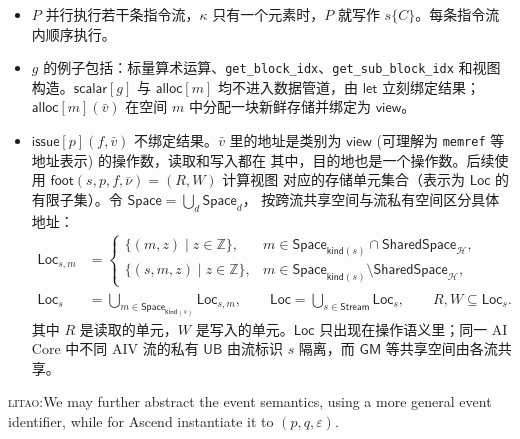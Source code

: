 \documentclass[UTF8,a4paper,11pt,fontset=fandol]{ctexart}
\newcommand{\kw}[1]{\ensuremath{\mathsf{#1}}}
\newcommand{\an}[3]{{\color{#2} \textsc{#1}:#3}}
\newcommand{\litao}[1]{\an{litao}{red}{#1}}
\begin{document}
\begin{itemize}
  \item $P$ 并行执行若干条指令流，$\kappa$ 只有一个元素时，$P$ 就写作
  $s\{C\}$。每条指令流内顺序执行。
  \item $g$ 的例子包括：标量算术运算、\texttt{get\_block\_idx}、\texttt{get\_sub\_block\_idx} 和视图构造。$\kw{scalar}[g]$ 与 $\kw{alloc}[m]$ 均不进入数据管道，由 $\kw{let}$ 立刻绑定结果；$\kw{alloc}[m](\bar v)$ 在空间 $m$ 中分配一块新鲜存储并绑定为 $\mathsf{view}$。
  \item $\kw{issue}[p](f,\bar v)$ 不绑定结果。$\bar v$ 里的地址是类别为
  $\mathsf{view}$ (可理解为 \texttt{memref} 等地址表示) 的操作数，读取和写入都在
  其中，目的地也是一个操作数。后续使用 $\mathsf{foot}(s,p,f,\bar\nu)=(R,W)$ 计算视图
  对应的存储单元集合（表示为 $\mathsf{Loc}$ 的有限子集）。令 $\mathsf{Space}=\bigcup_d\mathsf{Space}_d$，
  按跨流共享空间与流私有空间区分具体地址：
  \[
  \begin{aligned}
  \mathsf{Loc}_{s,m} &=
    \begin{cases}
      \{(m,z)\mid z\in\mathbb Z\}, & m\in\mathsf{Space}_{\mathsf{kind}(s)}\cap\mathsf{SharedSpace}_{\mathcal H},\\
      \{(s,m,z)\mid z\in\mathbb Z\}, & m\in\mathsf{Space}_{\mathsf{kind}(s)}\setminus\mathsf{SharedSpace}_{\mathcal H},
    \end{cases}\\
  \mathsf{Loc}_s &= \bigcup_{m\in\mathsf{Space}_{\mathsf{kind}(s)}}\mathsf{Loc}_{s,m},
  \qquad
  \mathsf{Loc} = \bigcup_{s\in\mathsf{Stream}}\mathsf{Loc}_s,
  \qquad
  R,W\subseteq\mathsf{Loc}_s.
  \end{aligned}
  \]
  其中 $R$ 是读取的单元，$W$ 是写入的单元。$\mathsf{Loc}$ 只出现在操作语义里；同一 AI Core 中不同 AIV 流的私有 $\mathsf{UB}$ 由流标识 $s$ 隔离，而 $\mathsf{GM}$ 等共享空间由各流共享。
\end{itemize}

\litao{We may further abstract the event semantics, using a more general event
identifier, while for Ascend instantiate it to $(p,q,\varepsilon)$.}


\end{document}

